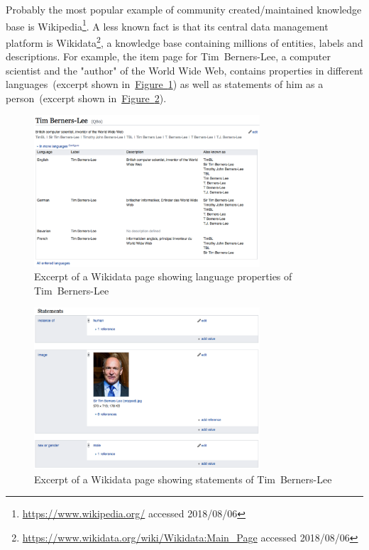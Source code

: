 Probably the most popular example of community created/maintained knowledge base is Wikipedia\footnote{\url{https://www.wikipedia.org/} accessed 2018/08/06}. A less known fact is that its central data management platform is Wikidata\footnote{\url{https://www.wikidata.org/wiki/Wikidata:Main_Page} accessed 2018/08/06}, a knowledge base containing millions of entities, labels and descriptions. For example, the item page for Tim~Berners-Lee, a computer scientist and the "author" of the World Wide Web, contains properties in different languages~(excerpt shown in~\hyperref[fig:wikidata_tim_berners_lee_lang]{Figure~\ref*{fig:wikidata_tim_berners_lee_lang}}) as well as statements of him as a person~(excerpt shown in~\hyperref[fig:wikidata_tim_berners_lee_stat]{Figure~\ref*{fig:wikidata_tim_berners_lee_stat}}). 
\begin{figure}
	 \centering
	 \includegraphics[width=0.75\textwidth]{graphics/wikidata_tim_berners_lee_lang}
	 \caption{Excerpt of a Wikidata page showing language properties of Tim~Berners-Lee}\label{fig:wikidata_tim_berners_lee_lang}
\end{figure}
\begin{figure}
	 \centering
	 \includegraphics[width=0.75\textwidth]{graphics/wikidata_tim_berners_lee_stat}
	 \caption{Excerpt of a Wikidata page showing statements of Tim~Berners-Lee}\label{fig:wikidata_tim_berners_lee_stat}
\end{figure}
